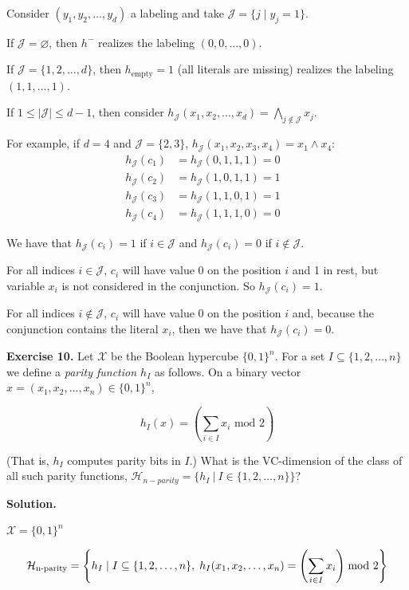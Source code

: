 \documentclass{article}
\newcommand{\<}{\langle}
\renewcommand{\>}{\rangle}
\renewcommand{\emptyset}{\varnothing}
\theoremstyle{definition}
\def\gH{{\mathcal{H}}}
\def\gJ{{\mathcal{J}}}
\def\gX{{\mathcal{X}}}
\newcommand{\sft}[2]{\{#1, \dots, #2\}}
\newcommand{\hnp}{\gH_{\text{n-parity}}}
\newcommand{\sft}[2]{\{#1, \dots, #2\}}
\newcommand{\szon}{\{0, 1\}^n}
\begin{document}
Consider $(y_1, y_2, \dots, y_d)$ a labeling and take $\gJ = \{j \mid y_j = 1\}$.

If $\gJ = \emptyset$, then $h^-$ realizes the labeling $(0, 0, \dots, 0)$.

If $\gJ = \{1, 2, \dots, d\}$, then $h_\text{empty} = 1$ (all literals are missing) realizes the
labeling $(1, 1, \dots, 1)$.

If $1 \leq |\gJ| \leq d-1$, then consider
$h_{\gJ}(x_1, x_2, \dots, x_d) = \bigwedge\limits_{j \notin \gJ} x_j$.

For example, if $d = 4$ and $\gJ = \{2, 3\}$, $h_{\gJ}(x_1, x_2, x_3, x_4) = x_1 \wedge x_4$:
\begin{align*}
  h_{\gJ}(c_1) &= h_{\gJ}(0, 1, 1, 1) = 0 & \\
  h_{\gJ}(c_2) &= h_{\gJ}(1, 0, 1, 1) = 1 & \\
  h_{\gJ}(c_3) &= h_{\gJ}(1, 1, 0, 1) = 1 & \\
  h_{\gJ}(c_4) &= h_{\gJ}(1, 1, 1, 0) = 0 &
\end{align*}

We have that $h_{\gJ}(c_i) = 1$ if $i \in \gJ$ and $h_{\gJ}(c_i) = 0$ if $i \notin \gJ$.

For all indices $i \in \gJ$, $c_i$ will have value 0 on the position $i$ and 1 in rest, but
variable $x_i$ is not considered in the conjunction. So $h_{\gJ}(c_i) = 1$.

For all indices $i \notin \gJ$, $c_i$ will have value 0 on the position $i$ and, because the
conjunction contains the literal $x_i$, then we have that $h_{\gJ}(c_i) = 0$.

\vspace{3mm}

\textbf{Exercise 10.} Let $\mathcal{X}$ be the Boolean hypercube $\{0,1\}^n$. For a set $I \subseteq \{1, 2,\dots,n\}$ we define a \textit{parity function $h_I$} as follows. On a binary vector $x = (x_1, x_2, \dots, x_n) \in \{0,1\}^n$,

$$h_I(x) = \left( \sum_{i\in I} x_i \text{ mod 2} \right)$$

(That is, $h_I$ computes parity bits in $I$.) What is the VC-dimension of the class of all such parity functions, $\mathcal{H}_{n-parity} = \{h_I \ | \ I \in \{1, 2, \dots, n\}\}$?

\textbf{Solution.}

$\gX = \szon$

\[\hnp = \left\{h_I \mid  I \subseteq \sft{1, 2}{n},\; h_I(x_1, x_2, \dots, x_n) = 
\left(\sum_{i \in I} x_i\right) \mkern-10mu \mod 2\right\}\]
\end{document}
